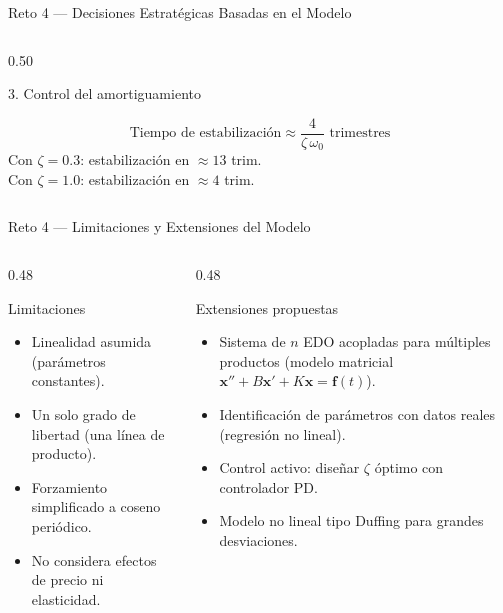 \documentclass[10pt,aspectratio=169]{beamer}
\begin{document}
\begin{frame}{Reto 4 — Decisiones Estratégicas Basadas en el Modelo}
\begin{columns}[T]
\begin{column}{0.50\textwidth}
\begin{block}{3. Control del amortiguamiento}
      \end{block}
      \vspace{4pt}
      \begin{tcolorbox}[alertbox={KPI derivado del modelo}]
        \small
        \[
          \text{Tiempo de estabilización} \approx
          \frac{4}{\zeta\,\omega_0} \text{ trimestres}
        \]
        Con $\zeta=0.3$: estabilización en $\approx 13$ trim.\\
        Con $\zeta=1.0$: estabilización en $\approx 4$ trim.
      \end{tcolorbox}
    \end{column}
  \end{columns}
\end{frame}

\begin{frame}{Reto 4 — Limitaciones y Extensiones del Modelo}
  \begin{columns}[T]
    \begin{column}{0.48\textwidth}
      \begin{alertblock}{Limitaciones}
        \begin{itemize}
          \small
          \item Linealidad asumida (parámetros constantes).
          \item Un solo grado de libertad (una línea de producto).
          \item Forzamiento simplificado a coseno periódico.
          \item No considera efectos de precio ni elasticidad.
        \end{itemize}
      \end{alertblock}
    \end{column}
    \begin{column}{0.48\textwidth}
      \begin{block}{Extensiones propuestas}
        \begin{itemize}
          \small
          \item Sistema de $n$ EDO acopladas para múltiples
                productos (modelo matricial $\mathbf{x}'' + B\mathbf{x}' + K\mathbf{x} = \mathbf{f}(t)$).
          \item Identificación de parámetros con datos reales
                (regresión no lineal).
          \item Control activo: diseñar $\zeta$ óptimo con
                controlador PD.
          \item Modelo no lineal tipo Duffing para grandes
                desviaciones.
        \end{itemize}
      \end{block}
    \end{column}
  \end{columns}
\end{frame}
\end{document}

